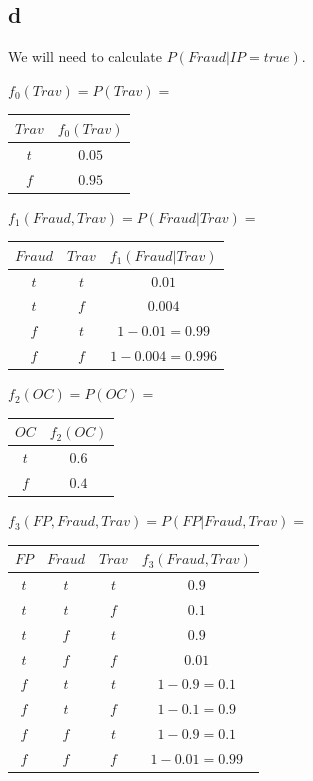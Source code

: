 \documentclass[10pt]{article}
\begin{document}
\begin{enumerate}
	\newpage
\part{d}

	We will need to calculate $P(Fraud | IP = true)$.
	
	$f_0(Trav) = P(Trav) = $
	\begin{tabular}{|c|c|}
	\hline
 	  $Trav$ & $f_0(Trav)$ \\
	\hline
	  $t$ & $ 0.05$  \\
	\hline
	  $f$ & $0.95$ \\
	\hline
	\end{tabular}

	$f_1(Fraud, Trav) = P(Fraud | Trav) =$
	\begin{tabular}{|c|c|c|}
	\hline
 	  $Fraud$ & $Trav$ & $f_1(Fraud | Trav)$ \\
	\hline
	  $t$ & $t$ & $0.01$  \\
	\hline
	 $t$ & $f$ & $0.004$  \\
	\hline
	  $f$ & $t$ & $1 - 0.01 = 0.99$ \\
	\hline
	$f$ & $f$ & $1 - 0.004 = 0.996$  \\
	\hline
	\end{tabular}
	
	$f_2(OC) = P(OC) = $
	\begin{tabular}{|c|c|}
	\hline
 	  $OC$ & $f_2(OC)$ \\
	\hline
	  $t$ & $ 0.6$  \\
	\hline
	  $f$ & $0.4$ \\
	\hline
	\end{tabular}
	
	$f_3(FP, Fraud, Trav) = P(FP | Fraud, Trav) = $
	\begin{tabular}{|c|c|c|c|}
	\hline
 	  $FP$ & $Fraud$ & $Trav$ & $f_3(Fraud, Trav)$ \\
 	  \hline
	  $t$ & $t$ & $t$ & $0.9$\\
	  \hline
	  $t$ & $t$ & $f$ & $0.1$\\
	  \hline
	  $t$ & $f$ & $t$ & $0.9$\\
	  \hline
	  $t$ & $f$ & $f$ & $0.01$\\
	  \hline
	  $f$ & $t$ & $t$ & $1 - 0.9 = 0.1$\\
	  \hline
	  $f$ & $t$ & $f$ & $1 - 0.1 = 0.9$\\
	  \hline
	  $f$ & $f$ & $t$ & $1 - 0.9 = 0.1$\\
	  \hline
	  $f$ & $f$ & $f$ & $1 - 0.01 = 0.99$\\
	  \hline
	\end{tabular}
	

\end{enumerate}
\end{document}
